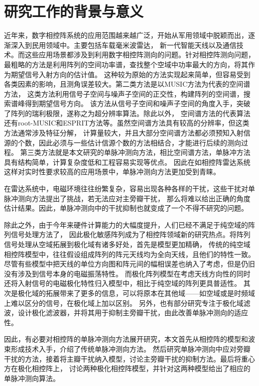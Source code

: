 \documentclass[master]{thesis-uestc}
\begin{document}
\thesistableofcontents

\thesischapterexordium

\section{研究工作的背景与意义}
近年来，数字相控阵系统的应用范围越来越广泛，开始从军用领域中脱颖而出，逐渐深入到民用领域中。主要包括车载毫米波雷达，
新一代智能天线以及通信技术。而这些应用场景都涉及到利用数字相控阵测向的问题。针对相控阵测向问题，
最粗略的方法是利用阵列的空间功率谱，查找整个空域中功率最大的方向，将其作为期望信号入射方向的估计值\cite{Capon}。
这种较为原始的方法实现起来简单，但容易受到各类因素的影响，且测角误差较大。第二类方法是以MUSIC方法为代表的空间谱方法\cite{Schmidt}，
这类方法利用信号子空间与噪声子空间的正交性，构建阵列的空间谱，搜索谱峰得到期望信号方向。
该方法从信号子空间和噪声子空间的角度入手，突破了阵列的瑞利极限，遂称之为超分辨率算法。除此以外，
空间谱方法的代表算法还有root-MUSIC和ESPRIT方法等\cite{Krim,Roy}。虽然空间谱方法具有较高的分辨率，但这类方法通常涉及特征分解，
计算量较大，并且大部分空间谱方法都必须预知入射信源的个数，因此必须与一些估计信源个数的方法相结合\cite{Wax}，才能进行后续的测向过程。
第三类方法就是本文研究的单脉冲测向方法，相比空间谱方法，单脉冲方法具有结构简单，计算复杂度低和工程容易实现等优点。
因此在如相控阵雷达系统这样对实时性要求较高的应用场景中，单脉冲测向方法更加受到青睐。

在雷达系统中，电磁环境往往纷繁复杂，容易出现各种各样的干扰，这些干扰对单脉冲测向方法提出了挑战，若无法应对主旁瓣干扰，
那么将难以给出正确的角度估计结果。因此，单脉冲测向中的干扰抑制也就变成了一个不得不研究的问题。

除此之外，由于今年来硬件计算能力的大幅度提升，人们已经不满足于纯空域的阵列信号处理方法了，
因此极化敏感阵列成为了相控阵领域新的研究热点。将阵列信号处理从空域拓展到极化域有诸多好处，首先是模型更加精确，
传统的纯空域相控阵模型中，往往假设组成阵列的阵元天线均为全向天线，且他们的特性一致。
尽管有些模型中把天线的单位方向图和阵元间的幅相误差也纳入了考虑，但是仍旧没有涉及到信号本身的电磁振荡特性。
而极化阵列模型在考虑天线方向性的同时还将入射信号的电磁极化特性归入模型中，相比于纯空域的阵列更具普适性。
其次是极化域的拓展带来了更多的信息，可以将原本在其他域——如空域或是时频域上难以区分的信号，在极化域上加以区别。
另外，也有部分研究专注于极化域滤波，设计极化滤波器，并将其用于抑制主旁瓣干扰，由此改善单脉冲测向的适应性。

因此，有必要对相控阵的单脉冲测向方法展开研究，本文首先从相控阵的模型和波束形成技术入手，介绍了传统单脉冲测向方法。
然后研究单脉冲测向中应对旁瓣干扰的方法，接着将主瓣干扰纳入模型，讨论主旁瓣干扰的抑制方法。最后将重心方在极化相控阵上，
讨论两种极化相控阵模型，并针对这两种模型给出了相应的单脉冲测向算法。
\end{document}
